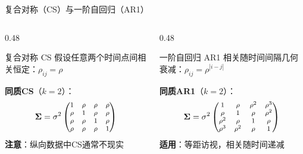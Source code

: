\documentclass[aspectratio=169,11pt]{beamer}
\newcommand{\bSigma}{\boldsymbol{\Sigma}}
\begin{document}
\begin{frame}{复合对称（CS）与一阶自回归（AR1）}
\begin{columns}[T,totalwidth=\textwidth]
\begin{column}{0.48\textwidth}
\begin{block}{\footnotesize 复合对称 CS}
\footnotesize
假设任意两个时间点间相关恒定：$\rho_{ij} = \rho$

\textbf{同质CS}（$k=2$）：
\vspace{-0.2cm}
\[
\footnotesize
\bSigma = \sigma^2 \begin{pmatrix}
1 & \rho & \rho & \rho \\
\rho & 1 & \rho & \rho \\
\rho & \rho & 1 & \rho \\
\rho & \rho & \rho & 1
\end{pmatrix}
\]
\vspace{-0.1cm}
\textcolor{warnred}{\footnotesize\textbf{注意}：纵向数据中CS通常不现实}
\end{block}
\end{column}
\begin{column}{0.48\textwidth}
\begin{block}{\footnotesize 一阶自回归 AR1}
\footnotesize
相关随时间间隔几何衰减：$\rho_{ij} = \rho^{|i-j|}$

\textbf{同质AR1}（$k=2$）：
\vspace{-0.2cm}
\[
\footnotesize
\bSigma = \sigma^2 \begin{pmatrix}
1 & \rho & \rho^2 & \rho^3 \\
\rho & 1 & \rho & \rho^2 \\
\rho^2 & \rho & 1 & \rho \\
\rho^3 & \rho^2 & \rho & 1
\end{pmatrix}
\]
\vspace{-0.1cm}
\textcolor{accentgreen}{\footnotesize\textbf{适用}：等距访视，相关随时间递减}
\end{block}
\end{column}
\end{columns}
\end{frame}
\end{document}
